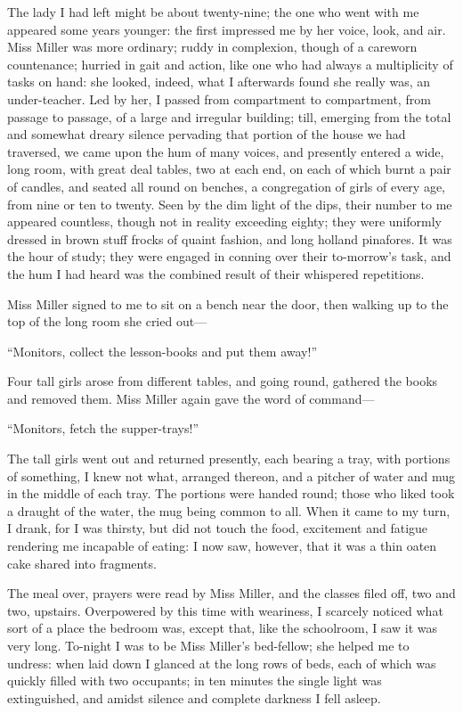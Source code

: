 The lady I had left might be about twenty-nine; the one who went with me
appeared some years younger: the first impressed me by her voice, look,
and air. Miss Miller was more ordinary; ruddy in complexion, though of
a careworn countenance; hurried in gait and action, like one who had
always a multiplicity of tasks on hand: she looked, indeed, what I
afterwards found she really was, an under-teacher. Led by her, I passed
from compartment to compartment, from passage to passage, of a large and
irregular building; till, emerging from the total and somewhat dreary
silence pervading that portion of the house we had traversed, we came
upon the hum of many voices, and presently entered a wide, long room,
with great deal tables, two at each end, on each of which burnt a pair
of candles, and seated all round on benches, a congregation of girls of
every age, from nine or ten to twenty. Seen by the dim light of the
dips, their number to me appeared countless, though not in reality
exceeding eighty; they were uniformly dressed in brown stuff frocks of
quaint fashion, and long holland pinafores. It was the hour of study;
they were engaged in conning over their to-morrow's task, and the hum I
had heard was the combined result of their whispered repetitions.

Miss Miller signed to me to sit on a bench near the door, then walking
up to the top of the long room she cried out---

\enquote{Monitors, collect the lesson-books and put them away!}

Four tall girls arose from different tables, and going round, gathered
the books and removed them. Miss Miller again gave the word of
command---

\enquote{Monitors, fetch the supper-trays!}

The tall girls went out and returned presently, each bearing a tray,
with portions of something, I knew not what, arranged thereon, and a
pitcher of water and mug in the middle of each tray. The portions were
handed round; those who liked took a draught of the water, the mug being
common to all. When it came to my turn, I drank, for I was thirsty, but
did not touch the food, excitement and fatigue rendering me incapable of
eating: I now saw, however, that it was a thin oaten cake shared into
fragments.

The meal over, prayers were read by Miss Miller, and the classes filed
off, two and two, upstairs. Overpowered by this time with weariness, I
scarcely noticed what sort of a place the bedroom was, except that, like
the schoolroom, I saw it was very long. To-night I was to be Miss
Miller's bed-fellow; she helped me to undress: when laid down I glanced
at the long rows of beds, each of which was quickly filled with two
occupants; in ten minutes the single light was extinguished, and amidst
silence and complete darkness I fell asleep.

